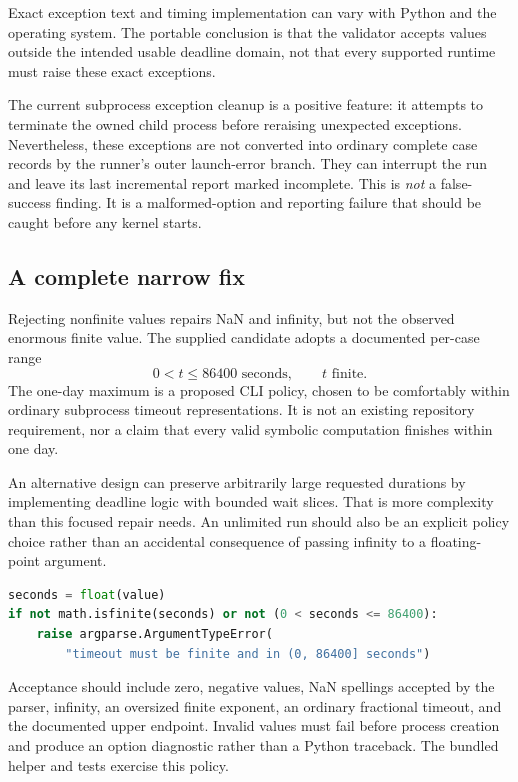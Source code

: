 \documentclass[11pt,letterpaper]{article}
\begin{document}
Exact exception text and timing implementation can vary with Python and the operating system. The portable conclusion is that the validator accepts values outside the intended usable deadline domain, not that every supported runtime must raise these exact exceptions.

The current subprocess exception cleanup is a positive feature: it attempts to terminate the owned child process before reraising unexpected exceptions. Nevertheless, these exceptions are not converted into ordinary complete case records by the runner's outer launch-error branch. They can interrupt the run and leave its last incremental report marked incomplete. This is \emph{not} a false-success finding. It is a malformed-option and reporting failure that should be caught before any kernel starts.~\cite{runner}

\subsection{A complete narrow fix}

Rejecting nonfinite values repairs NaN and infinity, but not the observed enormous finite value. The supplied candidate adopts a documented per-case range
\[
 0<t\leq 86400\text{ seconds},\qquad t\text{ finite}.
\]
The one-day maximum is a proposed CLI policy, chosen to be comfortably within ordinary subprocess timeout representations. It is not an existing repository requirement, nor a claim that every valid symbolic computation finishes within one day.

An alternative design can preserve arbitrarily large requested durations by implementing deadline logic with bounded wait slices. That is more complexity than this focused repair needs. An unlimited run should also be an explicit policy choice rather than an accidental consequence of passing infinity to a floating-point argument.

\begin{lstlisting}[language=Python]
seconds = float(value)
if not math.isfinite(seconds) or not (0 < seconds <= 86400):
    raise argparse.ArgumentTypeError(
        "timeout must be finite and in (0, 86400] seconds")
\end{lstlisting}

Acceptance should include zero, negative values, NaN spellings accepted by the parser, infinity, an oversized finite exponent, an ordinary fractional timeout, and the documented upper endpoint. Invalid values must fail before process creation and produce an option diagnostic rather than a Python traceback. The bundled helper and tests exercise this policy.
\end{document}
